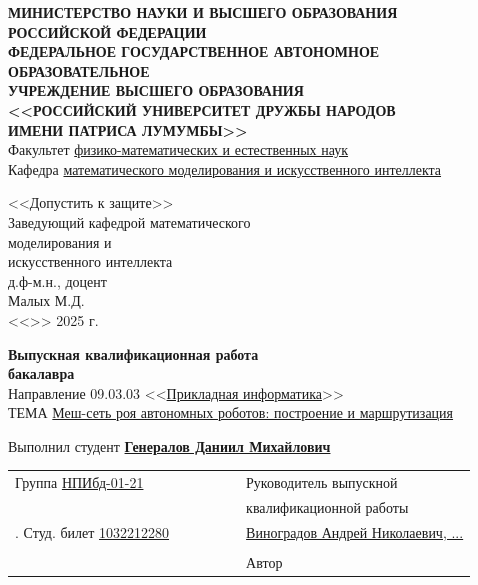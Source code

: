 \documentclass[%
]{report}
\begin{document}
\begin{titlepage}

  \begin{center}
  \hfill \break
  \textbf{МИНИСТЕРСТВО НАУКИ И ВЫСШЕГО ОБРАЗОВАНИЯ}\\
  \textbf{РОССИЙСКОЙ ФЕДЕРАЦИИ}\\
  \textbf{ФЕДЕРАЛЬНОЕ ГОСУДАРСТВЕННОЕ АВТОНОМНОЕ ОБРАЗОВАТЕЛЬНОЕ}\\
  \textbf{УЧРЕЖДЕНИЕ ВЫСШЕГО ОБРАЗОВАНИЯ}\\
  \textbf{<<РОССИЙСКИЙ УНИВЕРСИТЕТ ДРУЖБЫ НАРОДОВ}\\
  \textbf{ИМЕНИ ПАТРИСА ЛУМУМБЫ>>}\\
  \normalsize{Факультет \underline{физико-математических и естественных наук}}\\ 
  \normalsize{Кафедра \underline{математического моделирования и искусственного интеллекта}}\\

  \vspace*{\fill}

  \begin{flushright}
    \large{<<Допустить к защите>>}\\
    \normalsize{Заведующий кафедрой} 
    \normalsize{математического \\ моделирования и \\ искусственного интеллекта \\} 
    \normalsize{д.ф-м.н., доцент \\} 
    \underline{\phantom{signature signature}} Малых М.Д. \\
    <<\underline{\phantom{day}}>> \underline{\phantom{month month}} 2025 г.
    \end{flushright}
 
  \vspace*{\fill}
  \Large{\textbf{Выпускная квалификационная работа\\ бакалавра}}
  \\
  \normalsize
  Направление  09.03.03 <<\underline{Прикладная информатика}>>
  \\
  ТЕМА \uline{Меш-сеть роя автономных роботов: построение и маршрутизация} \\
  \vspace*{\fill}
  
  Выполнил студент \underline{\textbf{Генералов Даниил Михайлович}}
  \end{center}
  
  \noindent \begin{tabular}{p{0.5\linewidth} p{0.5\linewidth}}
      Группа \underline{НПИбд-01-21} & Руководитель выпускной  \\
      & квалификационной работы \\.
      Студ. билет \textnumero{} \underline{1032212280} & \underline{Виноградов Андрей Николаевич, ...}\\
      & \underline{\phantom{signature signature}} \\
      & Автор \underline{\phantom{signature signature}} \\
    \end{tabular}
   \vspace*{\fill}
   

\end{titlepage}
\end{document}
